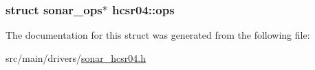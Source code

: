 \hypertarget{structhcsr04_ad8097a58ad611b2a4830226e5afd8ac2}{
\subsubsection[{ops}]{\setlength{\rightskip}{0pt plus 5cm}struct {\bf sonar\+\_\+ops}$\ast$ hcsr04\+::ops}}\label{structhcsr04_ad8097a58ad611b2a4830226e5afd8ac2}


The documentation for this struct was generated from the following file\+:\begin{DoxyCompactItemize}
\item 
src/main/drivers/\hyperlink{sonar__hcsr04_8h}{sonar\+\_\+hcsr04.\+h}\end{DoxyCompactItemize}
